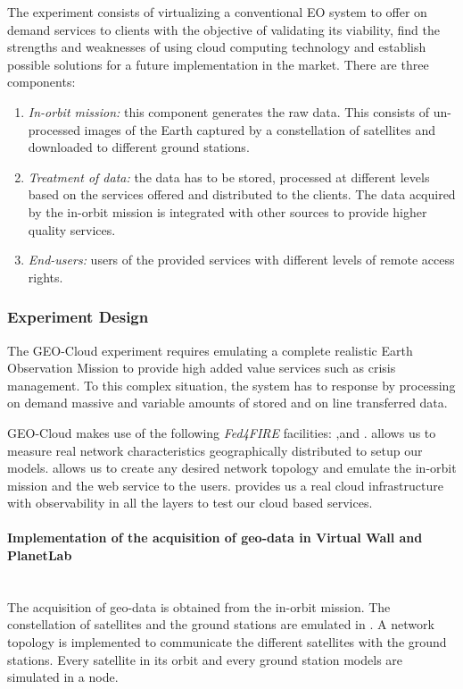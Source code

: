 The experiment consists of virtualizing a conventional \ac{EO} system to offer on
demand services to clients with the objective of validating its viability, find
the strengths and weaknesses of using cloud computing technology and establish
possible solutions for a future implementation in the market. There are three
components:
\begin{enumerate}
\item \emph{In-orbit mission:} this component generates the raw data. This consists of un-processed images of the Earth captured by a constellation of satellites and downloaded to different ground stations.
\item \emph{Treatment of data:} the data has to be stored, processed at different levels based on the services offered and distributed to the clients. The data acquired by the in-orbit mission is integrated with other sources to provide higher quality services.
\item \emph{End-users:} users of the provided services with different levels of remote access rights.

\end{enumerate}


\subsubsection{Experiment Design}


The GEO-Cloud experiment requires emulating a complete realistic Earth Observation Mission to provide high added value services such as crisis management. To this complex situation, the system has to response by processing on demand massive and variable amounts of stored and on line transferred data.

GEO-Cloud makes use of the following \emph{Fed4FIRE} facilities: \pl,\vw and
\bonfire. \pl allows us to measure real network characteristics geographically
distributed to setup our models. \vw allows us to create any desired network
topology and emulate the in-orbit mission and the web service to the
users. \bonfire provides us a real cloud infrastructure with observability in
all the layers to test our cloud based services.


\paragraph{Implementation of the acquisition of geo-data in Virtual Wall and
  PlanetLab}~\\
The acquisition of geo-data is obtained from the in-orbit mission. The
constellation of satellites and the ground stations are emulated in \vw. A
network topology is implemented to communicate the different satellites with the ground stations. Every satellite in its orbit and every ground station models are simulated in a node.

